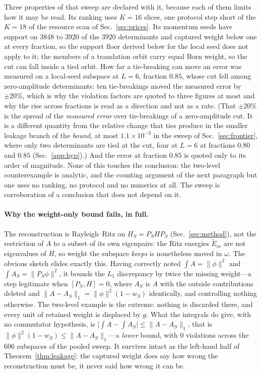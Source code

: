 Three properties of that sweep are declared with it, because each of them limits how it may be read.
Its ranking uses $K=16$ slices, one protocol step short of the $K=18$ of the resource scan of
Sec.~\ref{sec:prices}. Its momentum seeds have support on $3848$ to $3920$ of the $3920$ determinants and captured weight below one at every fraction, so the support floor derived below for the local seed does not apply to it; the members of a translation orbit carry equal Born weight, so the cut can fall inside a tied orbit. How far a tie-breaking can move an error was measured on a local-seed subspace at $L=6$, fraction $0.85$, whose cut fell among zero-amplitude determinants: ten tie-breakings moved the measured error by ${\pm}20\%$, which is why the violation factors are quoted to three figures at most and why the rise
across fractions is read as a direction and not as a rate. (That $\pm20\%$ is the spread of the
\emph{measured error} over tie-breakings of a zero-amplitude cut. It is a different quantity from the
relative change that ties produce in the smaller leakage branch of the \emph{bound}, at most $1.1\times10^{-3}$ in the sweep of Sec.~\ref{sec:frontier}, where
only two determinants are tied at the cut, four at $L=6$ at fractions $0.80$ and $0.85$ (Sec.~\ref{app:hyp}).) And the error at fraction $0.85$ is quoted only to its order of magnitude. None of this touches the conclusion: the
two-level counterexample is analytic, and the counting argument of the next paragraph but one uses no
ranking, no protocol and no numerics at all. The sweep is corroboration of a conclusion that does not
depend on it.

\paragraph{Why the weight-only bound fails, in full.}
The reconstruction is Rayleigh--Ritz on $H_S=P_SHP_S$ (Sec.~\ref{sec:method}), not the restriction of
$A$ to a subset of its own eigenpairs: the Ritz energies $\tilde E_m$ are not eigenvalues of $H$, so
weight the subspace \emph{keeps} is nonetheless moved in $\omega$. The obvious sketch elides exactly
this. Having correctly noted $\int A=\lVert\phi\rVert^{2}$ and $\int A_S=\lVert P_S\phi\rVert^{2}$, it
bounds the $L_1$ discrepancy by twice the missing weight---a step legitimate when $[P_S,H]=0$, where
$A_S$ is $A$ with the outside contributions deleted and
$\lVert A-A_S\rVert_1=\lVert\phi\rVert^{2}(1-w_S)$ identically, and controlling nothing otherwise. The
two-level example is the extreme: nothing is discarded there, and every unit of retained weight is
displaced by $g$. What the integrals do give, with no commutator hypothesis, is
$\lvert\int A-\int A_S\rvert\le\lVert A-A_S\rVert_{1}$, that is
$\lVert\phi\rVert^{2}(1-w_S)\le\lVert A-A_S\rVert_{1}$---a \emph{lower} bound, with $0$ violations across the $606$ subspaces of the pooled sweep. It survives intact as the
left-hand half of Theorem~\ref{thm:leakage}: the captured weight does say how wrong the reconstruction
must be, it never said how wrong it can be.

